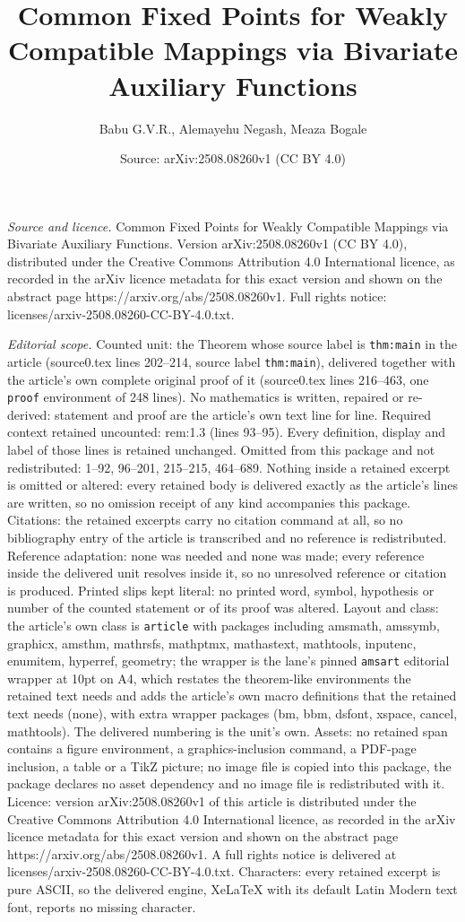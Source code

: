 \documentclass[10pt,a4paper]{amsart}
\title[Common Fixed Points for Weakly Compatible Mappings via Bivar]{Common Fixed Points for Weakly Compatible Mappings via Bivariate Auxiliary Functions}
\author{Babu G.V.R., Alemayehu Negash, Meaza Bogale}
\date{Source: arXiv:2508.08260v1 (CC BY 4.0)}
\begin{document}
\maketitle

\noindent\emph{Source and licence.} Common Fixed Points for Weakly Compatible Mappings via Bivariate Auxiliary Functions. Version arXiv:2508.08260v1 (CC BY 4.0), distributed under the Creative Commons Attribution 4.0 International licence, as recorded in the arXiv licence metadata for this exact version and shown on the abstract page https://arxiv.org/abs/2508.08260v1. Full rights notice: licenses/arxiv-2508.08260-CC-BY-4.0.txt.\par\smallskip

\noindent\textit{Editorial scope.} Counted unit: the Theorem whose source label is \texttt{thm:main} in the article (source0.tex lines 202--214, source label \texttt{thm:main}), delivered together with the article's own complete original proof of it (source0.tex lines 216--463, one \texttt{proof} environment of 248 lines). No mathematics is written, repaired or re-derived: statement and proof are the article's own text line for line. Required context retained uncounted: rem:1.3 (lines 93--95). Every definition, display and label of those lines is retained unchanged. Omitted from this package and not redistributed: 1--92, 96--201, 215--215, 464--689. Nothing inside a retained excerpt is omitted or altered: every retained body is delivered exactly as the article's lines are written, so no omission receipt of any kind accompanies this package. Citations: the retained excerpts carry no citation command at all, so no bibliography entry of the article is transcribed and no reference is redistributed. Reference adaptation: none was needed and none was made; every reference inside the delivered unit resolves inside it, so no unresolved reference or citation is produced. Printed slips kept literal: no printed word, symbol, hypothesis or number of the counted statement or of its proof was altered. Layout and class: the article's own class is \texttt{article} with packages including amsmath, amssymb, graphicx, amsthm, mathrsfs, mathptmx, mathastext, mathtools, inputenc, enumitem, hyperref, geometry; the wrapper is the lane's pinned \texttt{amsart} editorial wrapper at 10pt on A4, which restates the theorem-like environments the retained text needs and adds the article's own macro definitions that the retained text needs (none), with extra wrapper packages (bm, bbm, dsfont, xspace, cancel, mathtools). The delivered numbering is the unit's own. Assets: no retained span contains a figure environment, a graphics-inclusion command, a PDF-page inclusion, a table or a TikZ picture; no image file is copied into this package, the package declares no asset dependency and no image file is redistributed with it. Licence: version arXiv:2508.08260v1 of this article is distributed under the Creative Commons Attribution 4.0 International licence, as recorded in the arXiv licence metadata for this exact version and shown on the abstract page https://arxiv.org/abs/2508.08260v1. A full rights notice is delivered at licenses/arxiv-2508.08260-CC-BY-4.0.txt. Characters: every retained excerpt is pure ASCII, so the delivered engine, XeLaTeX with its default Latin Modern text font, reports no missing character.
\end{document}
